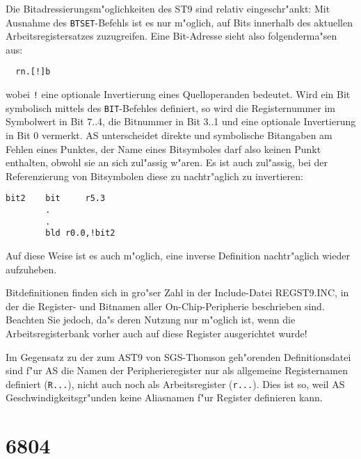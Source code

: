 \documentclass[12pt,a4paper,twoside]{report}
\newcommand{\tty}[1]{{\tt #1}}
\begin{document}
{Die Bitadressierungsm"oglichkeiten des ST9 sind relativ eingeschr"ankt: 
Mit Ausnahme des \tty{BTSET}-Befehls ist es nur m"oglich, auf Bits innerhalb
des aktuellen Arbeitsregistersatzes zuzugreifen.  Eine Bit-Adresse
sieht also folgenderma"sen aus:
\begin{verbatim}
  rn.[!]b
\end{verbatim}
wobei \verb?!? eine optionale Invertierung eines Quelloperanden bedeutet.  
Wird ein Bit symbolisch mittels des \tty{BIT}-Befehles definiert, so wird 
die Registernummer im Symbolwert in Bit 7..4, die Bitnummer in Bit 
3..1 und eine optionale Invertierung in Bit 0 vermerkt.  AS unterscheidet
direkte und symbolische Bitangaben am Fehlen eines Punktes,
der Name eines Bitsymboles darf also keinen Punkt enthalten, obwohl
sie an sich zul"assig w"aren.  Es ist auch zul"assig, bei der Referenzierung
von Bitsymbolen diese zu nachtr"aglich zu invertieren:
\begin{verbatim}
bit2    bit     r5.3
        .
        .
        bld	r0.0,!bit2
\end{verbatim}
Auf diese Weise ist es auch m"oglich, eine inverse Definition nachtr"aglich 
wieder aufzuheben.
\par
Bitdefinitionen finden sich in gro"ser Zahl in der Include-Datei
REGST9.INC, in der die Register- und Bitnamen aller On-Chip-Peripherie
beschrieben sind.  Beachten Sie jedoch, da"s deren Nutzung
nur m"oglich ist, wenn die Arbeitsregisterbank vorher auch auf diese
Register ausgerichtet wurde!
\par
Im Gegensatz zu der zum AST9 von SGS-Thomson geh"orenden Definitionsdatei
sind f"ur AS die Namen der Peripherieregister nur als allgemeine
Registernamen definiert (\tty{R...}), nicht auch noch als Arbeitsregister
(\tty{r...}).  Dies ist so, weil AS Geschwindigkeitsgr"unden keine 
Aliasnamen f"ur Register definieren kann.


\section{6804}

}
\end{document}
